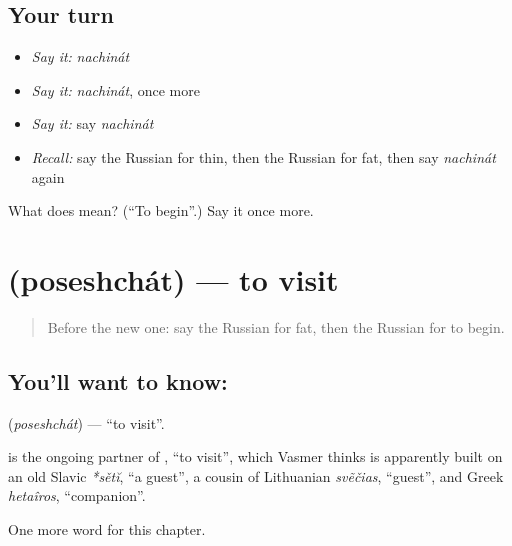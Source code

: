 \subsection*{Your turn}
\begin{itemize}
\raggedright
  \item \emph{Say it:} \emph{nachinát}
  \item \emph{Say it:} \emph{nachinát}, once more
  \item \emph{Say it:} say \emph{nachinát}
  \item \emph{Recall:} say the Russian for thin, then the Russian for fat, then say \emph{nachinát} again
\end{itemize}

\begin{tcolorbox}[breakable,colback=teal!4,colframe=teal!35!black,title={Before you move on}]
What does  mean? (\textquotedblleft{}To begin\textquotedblright{}.) Say it once more.
\end{tcolorbox}
\section[\texorpdfstring{\ru{посещать} (poseshchát)}{посещать (poseshchát)}]{ (poseshchát) — to visit}

\label{lesson:RU-C131-to-visit}



\begin{quote}
Before the new one: say the Russian for fat, then the Russian for to begin.
\end{quote}

\subsection*{You'll want to know: }
\textbf{} (\emph{poseshchát}) — \textquotedblleft{}to visit\textquotedblright{}.

\begin{cousinweb}
\textbf{} is the ongoing partner of \emph{}, \textquotedblleft{}to visit\textquotedblright{}, which Vasmer thinks is apparently built on an old Slavic \emph{*sětĭ}, \textquotedblleft{}a guest\textquotedblright{}, a cousin of Lithuanian \emph{svẽčias}, \textquotedblleft{}guest\textquotedblright{}, and Greek \emph{hetaîros}, \textquotedblleft{}companion\textquotedblright{}.
\end{cousinweb}

\begin{grammarlens}[title={What you've built}]
One more word for this chapter.
\end{grammarlens}


